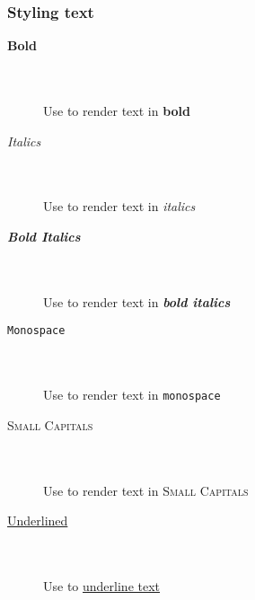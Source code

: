 \pagebreak
\subsubsection{Styling text}
\begin{description}
  \item[\textbf{Bold}] \ \\\\Use {} to render text in \textbf{bold}\\
  \item[\textit{Italics}] \ \\\\Use {} to render text in \textit{italics}\\
  \item[\textbf{\textit{Bold Italics}}] \ \\\\Use {} to render text in \textbf{\textit{bold italics}}\\
  \item[\texttt{Monospace}] \ \\\\Use {} to render text in \texttt{monospace}\\
  \item[\textsc{Small Capitals}] \ \\\\Use {} to render text in \textsc{Small Capitals}\\
  \item[\underline{Underlined}] \ \\\\Use {} to \underline{underline text}\\
\end{description}

